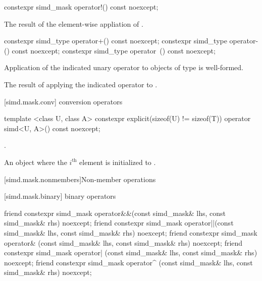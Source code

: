 \begin{itemdecl}
constexpr simd_mask operator!() const noexcept;
\end{itemdecl}

\begin{itemdescr}
  \pnum\returns
  The result of the element-wise appliation of .
\end{itemdescr}

\begin{itemdecl}
constexpr simd_type operator+() const noexcept;
constexpr simd_type operator-() const noexcept;
constexpr simd_type operator~() const noexcept;
\end{itemdecl}

\begin{itemdescr}
  \pnum\constraints
  Application of the indicated unary operator to objects of type  is well-formed.

  \pnum\returns
  The result of applying the indicated operator to .
\end{itemdescr}

[simd.mask.conv]{\texorpdfstring{}{simd_mask} conversion operators}

\begin{itemdecl}
template <class U, class A>
  constexpr explicit(sizeof(U) != sizeof(T)) operator simd<U, A>() const noexcept;
\end{itemdecl}

\begin{itemdescr}
  \pnum\constraints
  .

  \pnum\returns
  An object where the $i^\text{th}$ element is initialized to .
\end{itemdescr}

[simd.mask.nonmembers]{Non-member operations}

[simd.mask.binary]{\texorpdfstring{ binary}{simd_mask binary} operators}

\begin{itemdecl}
friend constexpr simd_mask operator&&(const simd_mask& lhs, const simd_mask& rhs) noexcept;
friend constexpr simd_mask operator||(const simd_mask& lhs, const simd_mask& rhs) noexcept;
friend constexpr simd_mask operator& (const simd_mask& lhs, const simd_mask& rhs) noexcept;
friend constexpr simd_mask operator| (const simd_mask& lhs, const simd_mask& rhs) noexcept;
friend constexpr simd_mask operator^ (const simd_mask& lhs, const simd_mask& rhs) noexcept;
\end{itemdecl}

